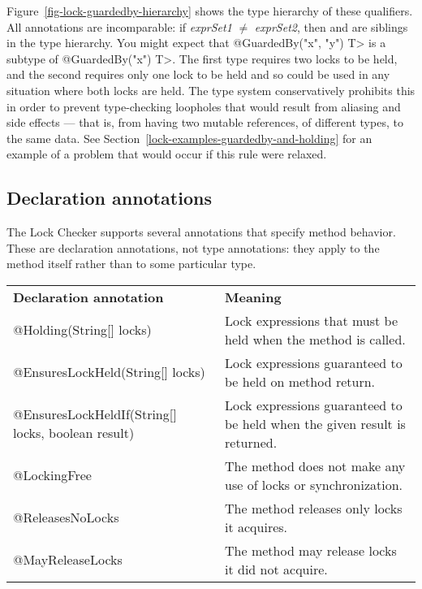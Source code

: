Figure~\ref{fig-lock-guardedby-hierarchy} shows the type hierarchy of these
qualifiers.
All  annotations are incomparable:
if \emph{exprSet1} $\neq$ \emph{exprSet2}, then  and
 are siblings in the type hierarchy.
You might expect that
\<@GuardedBy({"x", "y"}) T> is a subtype of \<@GuardedBy({"x"}) T>.  The
first type requires two locks to be held, and the second requires only one
lock to be held and so could be used in any situation where both locks are
held.  The type system conservatively prohibits this in order to prevent
type-checking loopholes that would result from aliasing and side effects
--- that is, from having two mutable references, of different types, to the
same data. See
Section~\ref{lock-examples-guardedby-and-holding} for an example
of a problem that would occur if this rule were relaxed.


\subsection{Declaration annotations\label{lock-declaration-annotations}}

The Lock Checker supports several annotations that specify method behavior.
These are declaration annotations, not type annotations: they apply to the
method itself rather than to some particular type.

\begin{tabular}{l|l|}
\textbf{Declaration annotation} & \textbf{Meaning} \\
@Holding(String[] locks) &
Lock expressions that must be held when the method is called.
\\
@EnsuresLockHeld(String[] locks) &
Lock expressions guaranteed to be held on method return.
\\
@EnsuresLockHeldIf(String[] locks, boolean result) &
Lock expressions guaranteed to be held when the given result is returned.
\\
@LockingFree &
The method does not make any use of locks or synchronization.
\\
@ReleasesNoLocks &
The method releases only locks it acquires.
\\
@MayReleaseLocks &
The method may release locks it did not acquire.
\\
\end{tabular}


